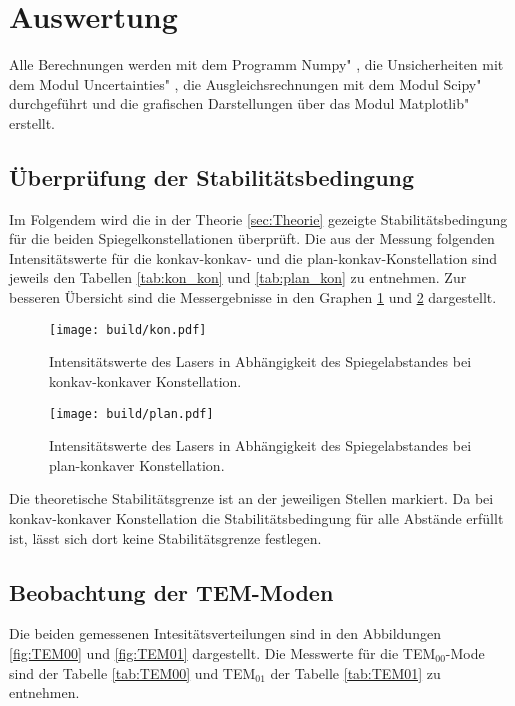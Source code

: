 \section{Auswertung}
\label{sec:Auswertung}
Alle Berechnungen werden mit dem Programm \glqq Numpy" \cite{numpy}, die Unsicherheiten mit dem Modul \glqq Uncertainties" \cite{uncertainties}, die Ausgleichsrechnungen mit dem Modul \glqq Scipy" \cite{scipy} durchgeführt und die grafischen Darstellungen über das Modul \glqq Matplotlib" \cite{matplotlib} erstellt.

\subsection{Überprüfung der Stabilitätsbedingung}

Im Folgendem wird die in der Theorie \ref{sec:Theorie} gezeigte Stabilitätsbedingung für die beiden Spiegelkonstellationen überprüft.
Die aus der Messung folgenden Intensitätswerte für die konkav-konkav- und die plan-konkav-Konstellation sind jeweils den Tabellen \ref{tab:kon_kon} und \ref{tab:plan_kon} zu entnehmen. 
Zur besseren Übersicht sind die Messergebnisse in den Graphen \ref{fig:kon} und \ref{fig:plan} dargestellt. 

\begin{figure}
    \centering
    \texttt{[image: build/kon.pdf]}
    \caption{Intensitätswerte des Lasers in Abhängigkeit des Spiegelabstandes bei konkav-konkaver Konstellation.}
    \label{fig:kon}
\end{figure}

\begin{figure}
    \centering
    \texttt{[image: build/plan.pdf]}
    \caption{Intensitätswerte des Lasers in Abhängigkeit des Spiegelabstandes bei plan-konkaver Konstellation.}
    \label{fig:plan}
\end{figure}

Die theoretische Stabilitätsgrenze ist an der jeweiligen Stellen markiert. Da bei konkav-konkaver Konstellation die Stabilitätsbedingung für alle Abstände erfüllt ist, lässt sich dort keine Stabilitätsgrenze festlegen. 

\subsection{Beobachtung der TEM-Moden}
 
Die beiden gemessenen Intesitätsverteilungen sind in den Abbildungen \ref{fig:TEM00} und \ref{fig:TEM01} dargestellt. Die Messwerte für die TEM$_{00}$-Mode sind der Tabelle \ref{tab:TEM00} und TEM$_{01}$ der Tabelle \ref{tab:TEM01} zu entnehmen.



